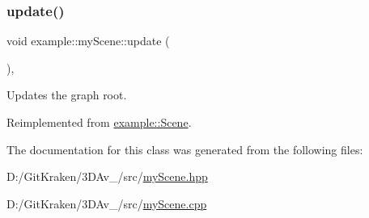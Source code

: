 \subsubsection{\texorpdfstring{update()}{update()}}
{\footnotesize\ttfamily void example\+::my\+Scene\+::update (\begin{DoxyParamCaption}{ }\end{DoxyParamCaption})\hspace{0.3cm}{\ttfamily [override]}, {\ttfamily [virtual]}}



Updates the graph root. 



Reimplemented from \mbox{\hyperlink{classexample_1_1_scene_af0a25c01b0759a02ab7a00364a853b6f}{example\+::\+Scene}}.



The documentation for this class was generated from the following files\+:\begin{DoxyCompactItemize}
\item 
D\+:/\+Git\+Kraken/3\+D\+Av\+\_/src/\mbox{\hyperlink{my_scene_8hpp}{my\+Scene.\+hpp}}\item 
D\+:/\+Git\+Kraken/3\+D\+Av\+\_/src/\mbox{\hyperlink{my_scene_8cpp}{my\+Scene.\+cpp}}\end{DoxyCompactItemize}
